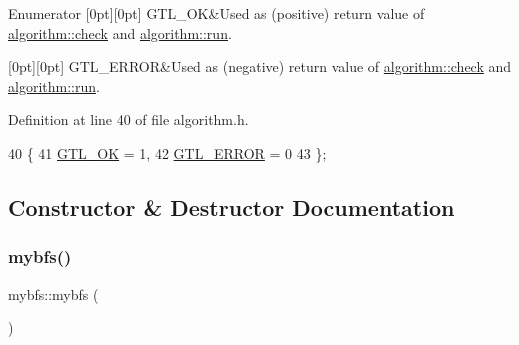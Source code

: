 \begin{DoxyEnumFields}{Enumerator}
[0pt][0pt]{}\mbox{\label{classalgorithm_af1a0078e153aa99c24f9bdf0d97f6710a5114c20e4a96a76b5de9f28bf15e282b}} 
G\+T\+L\+\_\+\+OK&Used as (positive) return value of \mbox{\hyperlink{classalgorithm_a76361fb03ad1cf643affc51821e43bed}{algorithm\+::check}} and \mbox{\hyperlink{classalgorithm_a734b189509a8d6b56b65f8ff772d43ca}{algorithm\+::run}}. \\
\hline

[0pt][0pt]{}\mbox{\label{classalgorithm_af1a0078e153aa99c24f9bdf0d97f6710a6fcf574690bbd6cf710837a169510dd7}} 
G\+T\+L\+\_\+\+E\+R\+R\+OR&Used as (negative) return value of \mbox{\hyperlink{classalgorithm_a76361fb03ad1cf643affc51821e43bed}{algorithm\+::check}} and \mbox{\hyperlink{classalgorithm_a734b189509a8d6b56b65f8ff772d43ca}{algorithm\+::run}}. \\
\hline

\end{DoxyEnumFields}


Definition at line 40 of file algorithm.\+h.


\begin{DoxyCode}
40          \{
41     \mbox{\hyperlink{classalgorithm_af1a0078e153aa99c24f9bdf0d97f6710a5114c20e4a96a76b5de9f28bf15e282b}{GTL\_OK}} = 1,
42     \mbox{\hyperlink{classalgorithm_af1a0078e153aa99c24f9bdf0d97f6710a6fcf574690bbd6cf710837a169510dd7}{GTL\_ERROR}} = 0
43     \};
\end{DoxyCode}


\subsection{Constructor \& Destructor Documentation}
\mbox{\label{classmybfs_a6eef20e8718e28577e66de8d0d6816a4}} 
\subsubsection{\texorpdfstring{mybfs()}{mybfs()}}
{\footnotesize\ttfamily mybfs\+::mybfs (\begin{DoxyParamCaption}{ }\end{DoxyParamCaption})\hspace{0.3cm}{\ttfamily [inline]}}



